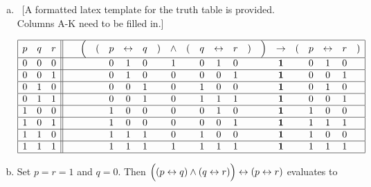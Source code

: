 \documentclass[12pt]{article}
\begin{document}
\begin{enumerate}[(a)]
			\bigskip


		\item \  [A formatted latex template for the truth table is provided.\\
			Columns A-K need to be filled in.]

			\[
				\begin{array}{|ccc||cccccccccccccccccccc|}
					\hline
					p & q & r & \  & \Bigl( & ( & p & \leftrightarrow & q & ) & \wedge & ( & q & \leftrightarrow & r & ) & \Bigr) & \rightarrow & ( & p & \leftrightarrow & r & ) \\
					\hline
					0 & 0 & 0 &    &        &   & 0 & 1               & 0 &   & 1      &   & 0 & 1               & 0 &   &        & {\bf 1}     &   & 0 & 1               & 0 &   \\
					\hline
					0 & 0 & 1 &    &        &   & 0 & 1               & 0 &   & 0      &   & 0 & 0               & 1 &   &        & {\bf 1}     &   & 0 & 0               & 1 &   \\
					\hline
					0 & 1 & 0 &    &        &   & 0 & 0               & 1 &   & 0      &   & 1 & 0               & 0 &   &        & {\bf 1}     &   & 0 & 1               & 0 &   \\
					\hline
					0 & 1 & 1 &    &        &   & 0 & 0               & 1 &   & 0      &   & 1 & 1               & 1 &   &        & {\bf 1}     &   & 0 & 0               & 1 &   \\
					\hline
					1 & 0 & 0 &    &        &   & 1 & 0               & 0 &   & 0      &   & 0 & 1               & 0 &   &        & {\bf 1}     &   & 1 & 0               & 0 &   \\
					\hline
					1 & 0 & 1 &    &        &   & 1 & 0               & 0 &   & 0      &   & 0 & 0               & 1 &   &        & {\bf 1}     &   & 1 & 1               & 1 &   \\
					\hline
					1 & 1 & 0 &    &        &   & 1 & 1               & 1 &   & 0      &   & 1 & 0               & 0 &   &        & {\bf 1}     &   & 1 & 0               & 0 &   \\
					\hline
					1 & 1 & 1 &    &        &   & 1 & 1               & 1 &   & 1      &   & 1 & 1               & 1 &   &        & {\bf 1}     &   & 1 & 1               & 1 &   \\
					\hline
				\end{array}
			\]

		\item
			\noindent
			Set $p=r=1$ and $q=0$. Then
			$\Bigl((p \leftrightarrow q)\wedge(q \leftrightarrow r)\Bigr) \leftrightarrow
			(p \leftrightarrow r)$
			evaluates to


\end{enumerate}
\end{document}
